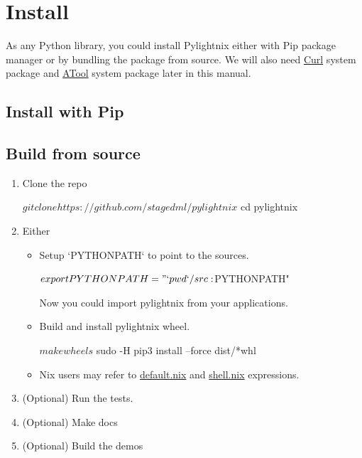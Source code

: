 \documentclass{article}
\begin{document}
\section{Install}

As any Python library, you could install Pylightnix either with Pip package
manager or by bundling the package from source. We will also need
\href{https://curl.se/}{Curl} system package and
\href{https://www.nongnu.org/atool/}{ATool} system package later in this manual.

\subsection{Install with Pip}


\subsection{Build from source}

\begin{enumerate}
\item Clone the repo
  \begin{shellcode}
  $ git clone https://github.com/stagedml/pylightnix
  $ cd pylightnix
  \end{shellcode}
\item Either
  \begin{itemize}
    \item Setup `PYTHONPATH` to point to the sources.
      \begin{shellcode}
      $ export PYTHONPATH="`pwd`/src:$PYTHONPATH"
      \end{shellcode}
      Now you could import pylightnix from your applications.
    \item Build and install pylightnix wheel.
      \begin{shellcode}
       $ make wheels
       $ sudo -H pip3 install --force dist/*whl
      \end{shellcode}
    \item Nix users may refer to \href{../default.nix}{default.nix} and
      \href{../shell.nix}{shell.nix} expressions.
  \end{itemize}
\item (Optional) Run the tests.
\item (Optional) Make docs
\item (Optional) Build the demos
\end{enumerate}
\end{document}
